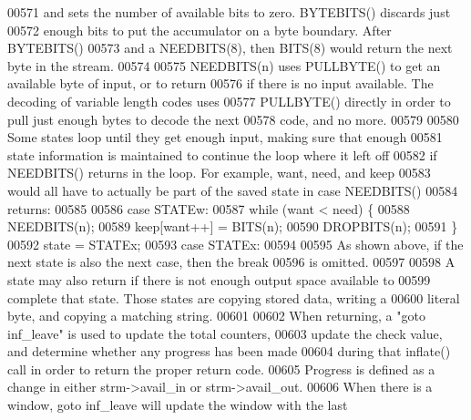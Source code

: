 \begin{DoxyCode}
{{{{00571 \textcolor{comment}{   and sets the number of available bits to zero.  BYTEBITS() discards just}
00572 \textcolor{comment}{   enough bits to put the accumulator on a byte boundary.  After BYTEBITS()}
00573 \textcolor{comment}{   and a NEEDBITS(8), then BITS(8) would return the next byte in the stream.}
00574 \textcolor{comment}{}
00575 \textcolor{comment}{   NEEDBITS(n) uses PULLBYTE() to get an available byte of input, or to return}
00576 \textcolor{comment}{   if there is no input available.  The decoding of variable length codes uses}
00577 \textcolor{comment}{   PULLBYTE() directly in order to pull just enough bytes to decode the next}
00578 \textcolor{comment}{   code, and no more.}
00579 \textcolor{comment}{}
00580 \textcolor{comment}{   Some states loop until they get enough input, making sure that enough}
00581 \textcolor{comment}{   state information is maintained to continue the loop where it left off}
00582 \textcolor{comment}{   if NEEDBITS() returns in the loop.  For example, want, need, and keep}
00583 \textcolor{comment}{   would all have to actually be part of the saved state in case NEEDBITS()}
00584 \textcolor{comment}{   returns:}
00585 \textcolor{comment}{}
00586 \textcolor{comment}{    case STATEw:}
00587 \textcolor{comment}{        while (want < need) \{}
00588 \textcolor{comment}{            NEEDBITS(n);}
00589 \textcolor{comment}{            keep[want++] = BITS(n);}
00590 \textcolor{comment}{            DROPBITS(n);}
00591 \textcolor{comment}{        \}}
00592 \textcolor{comment}{        state = STATEx;}
00593 \textcolor{comment}{    case STATEx:}
00594 \textcolor{comment}{}
00595 \textcolor{comment}{   As shown above, if the next state is also the next case, then the break}
00596 \textcolor{comment}{   is omitted.}
00597 \textcolor{comment}{}
00598 \textcolor{comment}{   A state may also return if there is not enough output space available to}
00599 \textcolor{comment}{   complete that state.  Those states are copying stored data, writing a}
00600 \textcolor{comment}{   literal byte, and copying a matching string.}
00601 \textcolor{comment}{}
00602 \textcolor{comment}{   When returning, a "goto inf\_leave" is used to update the total counters,}
00603 \textcolor{comment}{   update the check value, and determine whether any progress has been made}
00604 \textcolor{comment}{   during that inflate() call in order to return the proper return code.}
00605 \textcolor{comment}{   Progress is defined as a change in either strm->avail\_in or strm->avail\_out.}
00606 \textcolor{comment}{   When there is a window, goto inf\_leave will update the window with the last}
}}}}
\end{DoxyCode}
